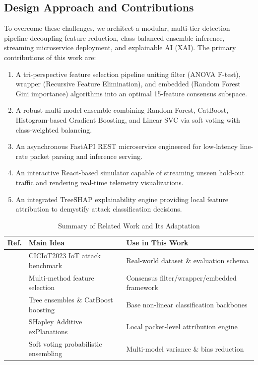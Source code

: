 \documentclass[conference]{IEEEtran}
\begin{document}
\subsection{Design Approach and Contributions}
To overcome these challenges, we architect a modular, multi-tier detection pipeline decoupling feature reduction, class-balanced ensemble inference, streaming microservice deployment, and explainable AI (XAI). The primary contributions of this work are:
\begin{enumerate}
    \item A tri-perspective feature selection pipeline uniting filter (ANOVA F-test), wrapper (Recursive Feature Elimination), and embedded (Random Forest Gini importance) algorithms into an optimal 15-feature consensus subspace.
    \item A robust multi-model ensemble combining Random Forest, CatBoost, Histogram-based Gradient Boosting, and Linear SVC via soft voting with class-weighted balancing.
    \item An asynchronous FastAPI REST microservice engineered for low-latency line-rate packet parsing and inference serving.
    \item An interactive React-based simulator capable of streaming unseen hold-out traffic and rendering real-time telemetry visualizations.
    \item An integrated TreeSHAP explainability engine providing local feature attribution to demystify attack classification decisions.
\end{enumerate}

\begin{table}[htbp]
\caption{Summary of Related Work and Its Adaptation}
\begin{center}
\begin{tabular}{p{0.7cm}p{3.2cm}p{3.8cm}}
\toprule
\textbf{Ref.} & \textbf{Main Idea} & \textbf{Use in This Work} \\
\midrule
\cite{ciciot} & CICIoT2023 IoT attack benchmark & Real-world dataset \& evaluation schema \\
\cite{guyon} & Multi-method feature selection & Consensus filter/wrapper/embedded framework \\
\cite{rf, catboost} & Tree ensembles \& CatBoost boosting & Base non-linear classification backbones \\
\cite{shap, treeshap} & SHapley Additive exPlanations & Local packet-level attribution engine \\
\cite{dietterich, kuncheva} & Soft voting probabilistic ensembling & Multi-model variance \& bias reduction \\
\bottomrule
\end{tabular}
\end{center}
\label{tab:related}
\end{table}
\end{document}
